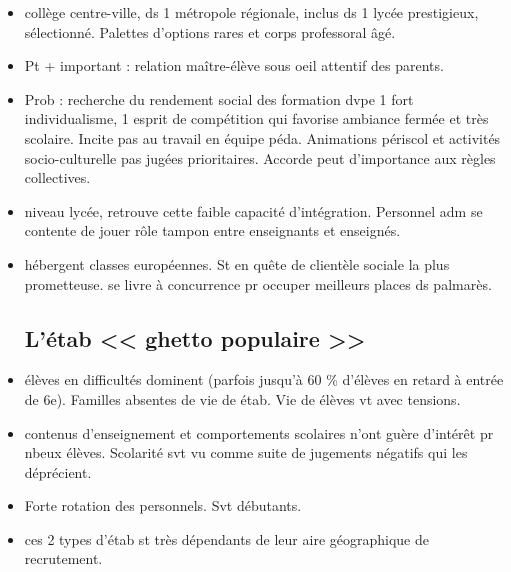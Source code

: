 \documentclass[12pt]{report}
\begin{document}
\begin{itemize}
\begin{itemize}
\item collège centre-ville, ds 1 métropole régionale, inclus ds 1 lycée prestigieux, sélectionné. Palettes d'options rares et corps professoral âgé. \\

\item Pt + important : relation maître-élève sous oeil attentif des parents. \\

\item Prob : recherche du rendement social des formation dvpe 1 fort individualisme, 1 esprit de compétition qui favorise ambiance fermée et très scolaire. Incite pas au travail en équipe péda. Animations périscol et activités socio-culturelle pas jugées prioritaires. Accorde peut d'importance aux règles collectives. \\

\item niveau lycée, retrouve cette faible capacité d'intégration. Personnel adm se contente de jouer rôle tampon entre enseignants et enseignés.

\item hébergent classes européennes. St en quête de clientèle sociale la plus prometteuse. se livre à concurrence pr occuper meilleurs places ds palmarès.


\subsection{L'étab << ghetto populaire >>}

\item élèves en difficultés dominent (parfois jusqu'à 60 \% d'élèves en retard à entrée de 6e). Familles absentes de vie de étab. Vie de élèves vt avec tensions. \\

\item contenus d'enseignement et comportements scolaires n'ont guère d'intérêt pr nbeux élèves. Scolarité svt vu comme suite de jugements négatifs qui les déprécient. \\

\item Forte rotation des personnels. Svt débutants.


\item ces 2 types d'étab st très dépendants de leur aire géographique de recrutement.






\end{itemize}




\end{itemize}
\end{document}

